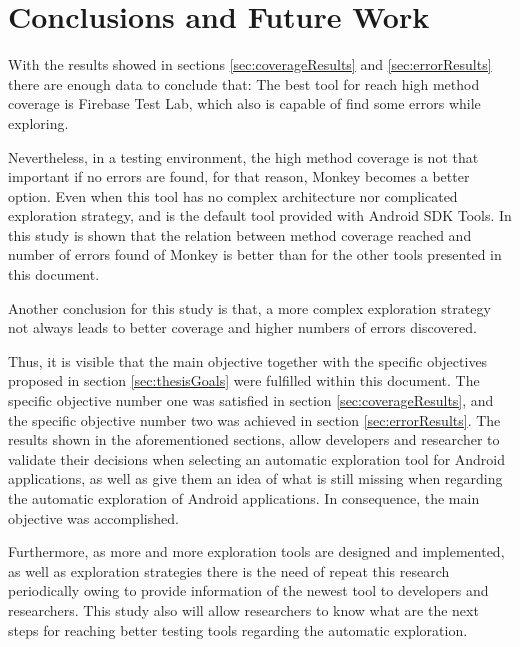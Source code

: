 
\chapter{Conclusions and Future Work} %
\label{Chapter5}

With the results showed in sections \ref{sec:coverageResults} and \ref{sec:errorResults} there are enough data to conclude that: The best tool for reach high method coverage is Firebase Test Lab, which also is capable of find some errors while exploring.

Nevertheless, in a testing environment, the high method coverage is not that important if no errors are found, for that reason, Monkey becomes a better option. Even when this tool has no complex architecture nor complicated exploration strategy, and is the default tool provided with Android SDK Tools. In this study is shown that the relation between method coverage reached and number of errors found of Monkey is better than for the other tools presented in this document. 

Another conclusion for this study is that, a more complex exploration strategy not always leads to better coverage and higher numbers of errors discovered.

Thus, it is visible that the main objective together with the specific objectives proposed in section \ref{sec:thesisGoals} were fulfilled within this document. The specific objective number one was satisfied in section \ref{sec:coverageResults}, and the specific objective number two was achieved in section \ref{sec:errorResults}. The results shown in the aforementioned sections, allow developers and researcher to validate their decisions when selecting an automatic exploration tool for Android applications, as well as give them an idea of what is still missing when regarding the automatic exploration of Android applications. In consequence, the main objective was accomplished.

Furthermore, as more and more exploration tools are designed and implemented, as well as exploration strategies there is the need of repeat this research periodically owing to provide information of the newest tool to developers and researchers. This study also will allow researchers to know what are the next steps for reaching better testing tools regarding the automatic exploration. 

